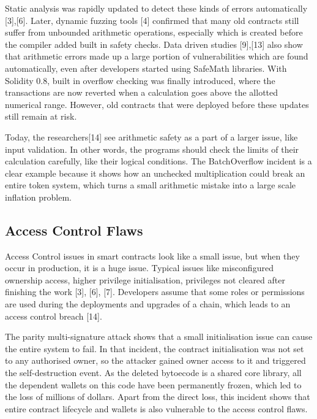 \documentclass[conference]{IEEEtran}
\begin{document}
Static analysis was rapidly updated to detect these kinds of errors automatically [3],[6]. Later, dynamic fuzzing tools [4] confirmed that many old contracts still suffer from unbounded arithmetic operations, especially which is created before the compiler added built in safety checks. Data driven studies [9],[13] also show that arithmetic errors made up a large portion of vulnerabilities which are found automatically, even after developers started using SafeMath libraries. With Solidity 0.8, built in overflow checking was finally introduced, where the transactions are now reverted when a calculation goes above the allotted numerical range. However, old contracts that were deployed before these updates still remain at risk.

Today, the researchers[14] see arithmetic safety as a part of a larger issue, like input validation. In other words, the programs should check the limits of their calculation carefully, like their logical conditions. The BatchOverflow incident is a clear example because it shows how an unchecked multiplication could break an entire token system, which turns a small arithmetic mistake into a large scale inflation problem.

\subsection{Access Control Flaws}
Access Control issues in smart contracts look like a small issue, but when they occur in production, it is a huge issue. Typical issues like misconfigured ownership access, higher privilege initialisation, privileges not cleared after finishing the work [3], [6], [7]. Developers assume that some roles or permissions are used during the deployments and upgrades of a chain, which leads to an access control breach [14]. 

The parity multi-signature attack shows that a small initialisation issue can cause the entire system to fail. In that incident, the contract initialisation was not set to any authorised owner, so the attacker gained owner access to it and triggered the self-destruction event. As the deleted bytoecode is a shared core library, all the dependent wallets on this code have been permanently frozen, which led to the loss of millions of dollars. Apart from the direct loss, this incident shows that entire contract lifecycle and wallets is also vulnerable to the access control flaws.
\end{document}
